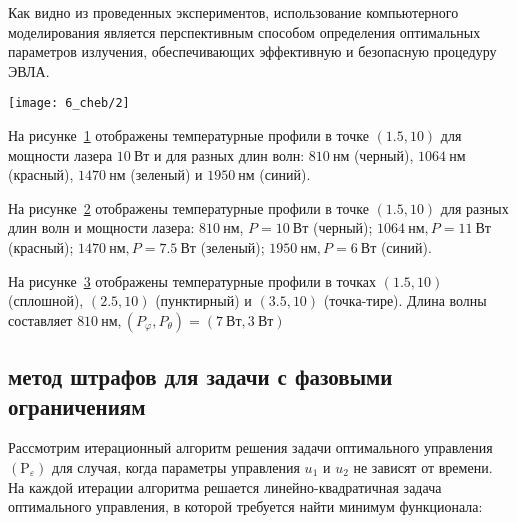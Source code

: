 Как видно из проведенных экспериментов, использование компьютерного
моделирования является перспективным способом определения оптимальных
параметров излучения, обеспечивающих эффективную и безопасную процедуру ЭВЛА.

\begin{center}
    \texttt{[image: 6\_cheb/2]}
\end{center}

\begin{figure}[ht]
    \label{fig:4_3:4}
    \caption{}
\end{figure}
На рисунке~\ref{fig:4_3:4} отображены температурные профили
в точке $(1.5,10)$ для мощности лазера
$10 \mathrm{~Вт}$ и для разных длин волн: $810 \mathrm{~нм}$ (черный),
$1064 \mathrm{~нм}$ (красный), $1470 \mathrm{~нм}$
(зеленый) и $1950 \mathrm{~нм}$ (синий).

\begin{figure}[ht]
    \label{fig:4_3:5}
    \caption{}
\end{figure}
На рисунке~\ref{fig:4_3:5} отображены температурные профили в точке $(1.5,10)$ для разных
длин волн и мощности лазера: $810 \mathrm{~нм}$, $P=10 \mathrm{~Вт}$
(черный); $1064 \mathrm{~нм}, P=11 \mathrm{~Вт}$ (красный);
$1470 \mathrm{~нм}, P=7.5 \mathrm{~Вт}$ (зеленый);
$1950 \mathrm{~нм}, P=6 \mathrm{~Вт}$ (синий).


\begin{figure}[ht]
    \label{fig:4_3:6}
    \caption{}
\end{figure}
На рисунке~\ref{fig:4_3:6} отображены температурные профили в точках $(1.5,10)$ (сплошной),
$(2.5,10)$ (пунктирный) и $(3.5,10)$ (точка-тире).
Длина волны составляет $810 \mathrm{~нм},\left(P_{\varphi},
P_{\theta}\right)=(7 \mathrm{~Вт}, 3 \mathrm{~Вт})$



\subsection{метод штрафов для задачи с фазовыми ограничениям}
\label{subsec:ch4/sec3/subsec5}


Рассмотрим итерационный алгоритм решения задачи оптимального управления
$\left(\mathrm{P}_{\varepsilon}\right)$ для случая, когда параметры управления
$u_{1}$ и $u_{2}$ не зависят от времени.
На каждой итерации алгоритма
решается линейно-квадратичная задача оптимального управления,
в которой требуется найти минимум функционала:

